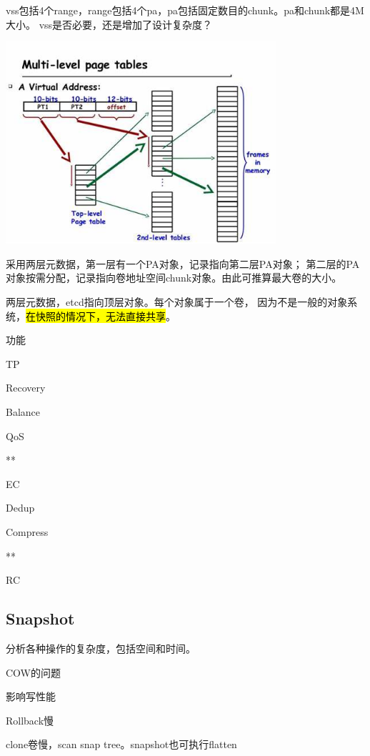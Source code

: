 vss包括4个range，range包括4个pa，pa包括固定数目的chunk。pa和chunk都是4M大小。
vss是否必要，还是增加了设计复杂度？

\begin{center}
\includegraphics[width=10cm]{../imgs/pagetable.jpeg}
\end{center}

采用两层元数据，第一层有一个PA对象，记录指向第二层PA对象；
第二层的PA对象按需分配，记录指向卷地址空间chunk对象。由此可推算最大卷的大小。

两层元数据，etcd指向顶层对象。每个对象属于一个卷，
因为不是一般的对象系统，\hl{在快照的情况下，无法直接共享}。

\hrulefill

功能
\begin{enumbox}
\item TP
\item Recovery
\item Balance
\item QoS
\item ***
\item EC
\item Dedup
\item Compress
\item ***
\item RC
\end{enumbox}

\subsection{Snapshot}

分析各种操作的复杂度，包括空间和时间。

\hrulefill

COW的问题
\begin{enumbox}
\item 影响写性能
\item Rollback慢
\item clone卷慢，scan snap tree。snapshot也可执行flatten
\end{enumbox}

